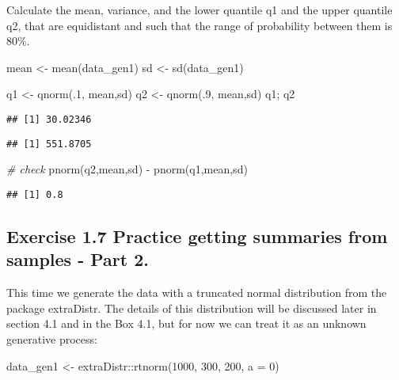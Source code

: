 \documentclass[
]{article}
\newenvironment{Shaded}{\begin{snugshade}}{\end{snugshade}}
\newcommand{\AttributeTok}[1]{\textcolor[rgb]{0.77,0.63,0.00}{#1}}
\newcommand{\CommentTok}[1]{\textcolor[rgb]{0.56,0.35,0.01}{\textit{#1}}}
\newcommand{\DecValTok}[1]{\textcolor[rgb]{0.00,0.00,0.81}{#1}}
\newcommand{\FunctionTok}[1]{\textcolor[rgb]{0.00,0.00,0.00}{#1}}
\newcommand{\NormalTok}[1]{#1}
\newcommand{\OtherTok}[1]{\textcolor[rgb]{0.56,0.35,0.01}{#1}}
\newcommand{\SpecialCharTok}[1]{\textcolor[rgb]{0.00,0.00,0.00}{#1}}
\begin{document}
Calculate the mean, variance, and the lower quantile q1 and the upper
quantile q2, that are equidistant and such that the range of probability
between them is 80\%.

\begin{Shaded}
\begin{Highlighting}[]
\NormalTok{mean }\OtherTok{\textless{}{-}} \FunctionTok{mean}\NormalTok{(data\_gen1)}
\NormalTok{sd }\OtherTok{\textless{}{-}} \FunctionTok{sd}\NormalTok{(data\_gen1)}

\NormalTok{q1 }\OtherTok{\textless{}{-}} \FunctionTok{qnorm}\NormalTok{(.}\DecValTok{1}\NormalTok{,}
\NormalTok{            mean,sd)}
\NormalTok{q2 }\OtherTok{\textless{}{-}} \FunctionTok{qnorm}\NormalTok{(.}\DecValTok{9}\NormalTok{,}
\NormalTok{            mean,sd)}
\NormalTok{q1; q2}
\end{Highlighting}
\end{Shaded}

\begin{verbatim}
## [1] 30.02346
\end{verbatim}

\begin{verbatim}
## [1] 551.8705
\end{verbatim}

\begin{Shaded}
\begin{Highlighting}[]
\CommentTok{\# check}
\FunctionTok{pnorm}\NormalTok{(q2,mean,sd) }\SpecialCharTok{{-}} \FunctionTok{pnorm}\NormalTok{(q1,mean,sd)}
\end{Highlighting}
\end{Shaded}

\begin{verbatim}
## [1] 0.8
\end{verbatim}

\hypertarget{exercise-1.7-practice-getting-summaries-from-samples---part-2.}{%
\subsection{Exercise 1.7 Practice getting summaries from samples - Part
2.}\label{exercise-1.7-practice-getting-summaries-from-samples---part-2.}}

This time we generate the data with a truncated normal distribution from
the package extraDistr. The details of this distribution will be
discussed later in section 4.1 and in the Box 4.1, but for now we can
treat it as an unknown generative process:

\begin{Shaded}
\begin{Highlighting}[]
\NormalTok{data\_gen1 }\OtherTok{\textless{}{-}}\NormalTok{ extraDistr}\SpecialCharTok{::}\FunctionTok{rtnorm}\NormalTok{(}\DecValTok{1000}\NormalTok{, }\DecValTok{300}\NormalTok{, }\DecValTok{200}\NormalTok{, }\AttributeTok{a =} \DecValTok{0}\NormalTok{)}
\end{Highlighting}
\end{Shaded}
\end{document}
